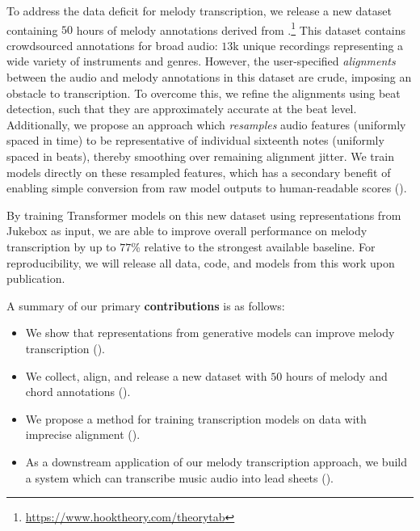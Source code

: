 To address the data deficit for melody transcription, 
we release a new dataset containing $50$ hours of melody annotations 
derived 
from \hooktheory.\footnote{\url{https://www.hooktheory.com/theorytab}} 
This dataset contains crowdsourced annotations for broad audio: 
$13$k unique recordings representing a wide variety of instruments and genres. 
However, the user-specified \emph{alignments} between the audio and melody annotations in this dataset are crude, imposing an obstacle to transcription. 
To overcome this, we refine the alignments using beat detection, such that they are approximately accurate at the beat level. 
Additionally, we propose an approach which \emph{resamples} audio features (uniformly spaced in time) to be representative of individual sixteenth notes (uniformly spaced in beats), 
thereby smoothing over remaining alignment jitter. 
We train models directly on these resampled features, 
which has a secondary benefit of enabling simple conversion from raw model outputs to human-readable scores ().

By training Transformer models on this new dataset using representations from Jukebox as input, we are able to improve overall performance on melody transcription by 
up to $77$\% 
relative  to the strongest available baseline. 
For reproducibility, we will release all data, code, and models from this work upon publication.


A summary of our primary \textbf{contributions} is as follows:
\begin{itemize}
    \item We show that representations from generative models can improve melody transcription ().
    \item We collect, align, and release a new dataset with $50$ hours of melody and chord annotations ().
    \item We propose a method for training transcription models on data with imprecise alignment ().
    \item As a downstream application of our melody transcription approach, we build a system which can transcribe music audio into lead sheets ().
\end{itemize}